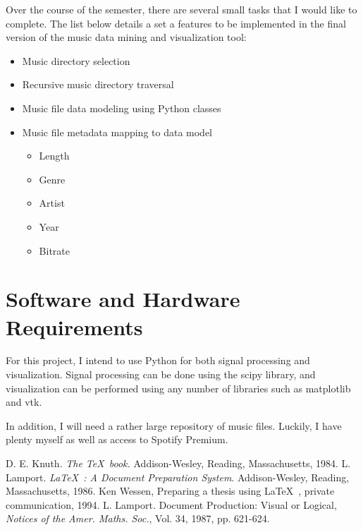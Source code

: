 \documentclass[12pt, a4paper]{article}
\begin{document}
Over the course of the semester, there are several small tasks that I would like
to complete. The list below details a set a features to be implemented in the
final version of the music data mining and visualization tool:

\begin{itemize}
  \item Music directory selection
  \item Recursive music directory traversal
  \item Music file data modeling using Python classes
  \item Music file metadata mapping to data model
  \begin{itemize}
     \item Length
     \item Genre
     \item Artist
     \item Year
     \item Bitrate
   \end{itemize}
\end{itemize}

\section*{Software and Hardware Requirements}

For this project, I intend to use Python for both signal processing and
visualization. Signal processing can be done using the scipy library, and
visualization can be performed using any number of libraries such as
matplotlib and vtk.

In addition, I will need a rather large repository of music files. Luckily,
I have plenty myself as well as access to Spotify Premium.

\begin{thebibliography}{9}
 D. E. Knuth. {\em The \TeX~book.}\/ Addison-Wesley,
Reading, Massachusetts, 1984.
 L. Lamport. {\em \LaTeX~: A Document Preparation
System}.\/ Addison-Wesley, Reading, Massachusetts, 1986.
 Ken Wessen, Preparing a thesis using \LaTeX~, private
communication, 1994.
 L. Lamport. Document Production: Visual
or Logical, {\em Notices of the Amer. Maths. Soc.},\/ Vol. 34,
1987, pp. 621-624.
\end{thebibliography}
\end{document}
